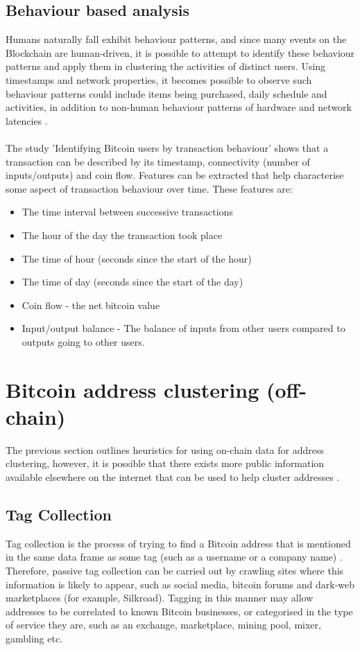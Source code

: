 \subsection{Behaviour based analysis}\label{background:behaviour-clustering}
Humans naturally fall exhibit behaviour patterns, and since many events on the Blockchain are human-driven, it is possible to attempt to identify these behaviour patterns and apply them in clustering the activities of distinct users. Using timestamps and network properties, it becomes possible to observe such behaviour patterns could include items being purchased, daily schedule and activities, in addition to non-human behaviour patterns of hardware and network latencies \cite{RefWorks:doc:5c3f3459e4b042abd3bceede}. 
\\\\
The study 'Identifying Bitcoin users by transaction behaviour' \cite{RefWorks:doc:5c3f3459e4b042abd3bceede} shows that a transaction can be described by its timestamp, connectivity (number of inputs/outputs) and coin flow. Features can be extracted that help characterise some aspect of transaction behaviour over time. These features are: 
\begin{itemize}
    \item The time interval between successive transactions
    \item The hour of the day the transaction took place
    \item The time of hour (seconds since the start of the hour)
    \item The time of day (seconds since the start of the day)
    \item Coin flow - the net bitcoin value  
    \item Input/output balance - The balance of inputs from other users compared to outputs going to other users.
\end{itemize}

\section{Bitcoin address clustering (off-chain)}
The previous section outlines heuristics for using on-chain data for address clustering, however, it is possible that there exists more public information available elsewhere on the internet that can be used to help cluster addresses \cite{RefWorks:doc:5c3ef27be4b03c7dd82ce4e6}. 

\subsection{Tag Collection}\label{background-tag-collection}
Tag collection is the process of trying to find a Bitcoin address that is mentioned in the same data frame as some tag (such as a username or a company name) \cite{RefWorks:doc:5c3ef27be4b03c7dd82ce4e6}. Therefore, passive tag collection can be carried out by crawling sites where this information is likely to appear, such as social media, bitcoin forums and dark-web marketplaces (for example, Silkroad). Tagging in this manner may allow addresses to be correlated to known Bitcoin businesses, or categorised in the type of service they are, such as an exchange, marketplace, mining pool, mixer, gambling etc. 

